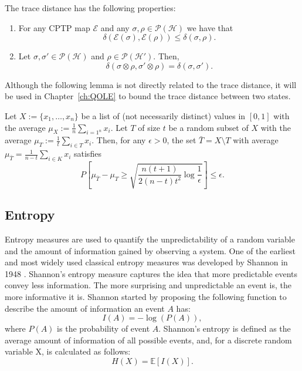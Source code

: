 
\begin{lemma}
The trace distance has the following properties:
\begin{enumerate}
    \item For any CPTP map $\mathcal{E}$ and any $\sigma, \rho \in \mathcal{P}(\mathcal{H})$ we have that
    $$\delta(\mathcal{E}(\sigma), \mathcal{E}(\rho)) \leq \delta(\sigma, \rho).$$
    
    \item Let $\sigma, \sigma' \in \mathcal{P}(\mathcal{H})$ and $\rho \in \mathcal{P}(\mathcal{H}')$. Then,
    $$\delta(\sigma\otimes \rho, \sigma'\otimes \rho) = \delta(\sigma, \sigma').$$
\end{enumerate}
\label{lemma:trace_distance}
\end{lemma}

Although the following lemma is not directly related to the trace distance, it will be used in Chapter~\ref{ch:QOLE} to bound the trace distance between two states.

\begin{lemma}
Let $X:=\{x_1, \ldots, x_n\}$ be a list of (not necessarily distinct) values in $[0,1]$ with the average $\mu_X:=\frac{1}{n}\sum_{i=1^n} x_i$. Let $T$ of size $t$ be a random subset of $X$ with the average $\mu_T := \frac{1}{t}\sum_{i\in T} x_i$. Then, for any $\epsilon > 0$, the set $\bar{T} = X\setminus T$ with average $\mu_{\bar{T}} = \frac{1}{n-t}\sum_{i\in K} x_i$ satisfies
$$P\left[ \mu_{\bar{T}} - \mu_T \geq \sqrt{\frac{n(t+1)}{2(n-t)t^2} \log \frac{1}{\epsilon}}  \right] \leq \epsilon.$$
\label{lemma:trace_distance_bound}
\end{lemma}


\subsection{Entropy}

Entropy measures are used to quantify the unpredictability of a random variable and the amount of information gained by observing a system. One of the earliest and most widely used classical entropy measures was developed by Shannon in 1948 \cite{S48}. Shannon's entropy measure captures the idea that more predictable events convey less information. The more surprising and unpredictable an event is, the more informative it is. Shannon started by proposing the following function to describe the amount of information an event $A$ has:
$$I(A) = - \log \left( P(A) \right),$$
where $P(A)$ is the probability of event $A$. Shannon's entropy is defined as the average amount of information of all possible events, and, for a discrete random variable X,  is calculated as follows:
$$H(X) = \mathbb{E}\left[ I(X) \right].$$

